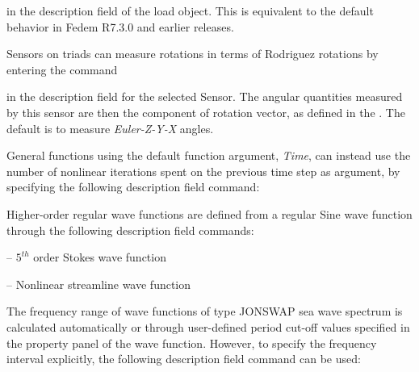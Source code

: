 
\noindent
in the description field of the load object. This is equivalent to the
default behavior in Fedem R7.3.0 and earlier releases.




Sensors on triads can measure rotations in terms of Rodriguez rotations
by entering the command


\noindent
in the description field for the selected Sensor. The angular quantities
measured by this sensor are then the component of rotation vector, as defined in
the .
The default is to measure {\sl Euler-Z-Y-X} angles.

General functions using the default function argument, {\sl Time}, can instead
use the number of nonlinear iterations spent on the previous time step as
argument, by specifying the following description field command:





Higher-order regular wave functions are defined from a regular Sine wave
function through the following description field commands:

\medskip
{}
\tabto{18mm} -- $5^{th}$ order Stokes wave function

\tabto{18mm} -- Nonlinear streamline wave function
\medskip



The frequency range of wave functions of type JONSWAP sea wave spectrum is
calculated automatically or through user-defined period cut-off values specified
in the property panel of the wave function. However, to specify the frequency
interval explicitly, the following description field command can be used:


